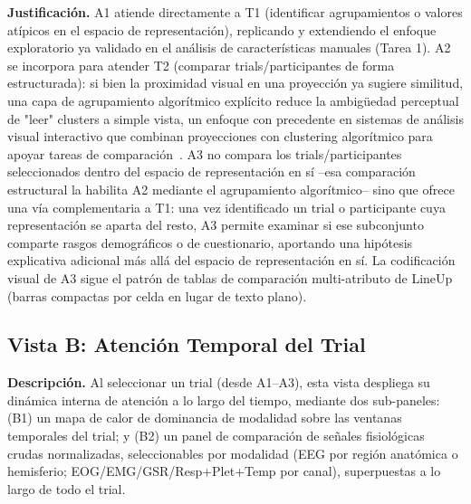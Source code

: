 \textbf{Justificación.} A1 atiende directamente a T1 (identificar agrupamientos o valores atípicos en el espacio de representación), replicando y extendiendo el enfoque exploratorio ya validado en el análisis de características manuales (Tarea 1). A2 se incorpora para atender T2 (comparar trials/participantes de forma estructurada): si bien la proximidad visual en una proyección ya sugiere similitud, una capa de agrupamiento algorítmico explícito reduce la ambigüedad perceptual de "leer" clusters a simple vista, un enfoque con precedente en sistemas de análisis visual interactivo que combinan proyecciones con clustering algorítmico para apoyar tareas de comparación~\cite{evoair}. A3 no compara los trials/participantes seleccionados dentro del espacio de
representación en sí --esa comparación estructural la habilita A2 mediante
el agrupamiento algorítmico-- sino que ofrece una vía complementaria a T1:
una vez identificado un trial o participante cuya representación se aparta
del resto, A3 permite examinar si ese subconjunto comparte rasgos
demográficos o de cuestionario, aportando una hipótesis explicativa
adicional más allá del espacio de representación en sí. La codificación
visual de A3 sigue el patrón de tablas de comparación multi-atributo de
LineUp~\cite{gratzl2013lineup} (barras compactas por celda en lugar de texto
plano).

\subsection{Vista B: Atención Temporal del Trial}
\label{sec:vista_b}

\textbf{Descripción.} Al seleccionar un trial (desde A1--A3), esta vista despliega su dinámica interna de atención a lo largo del tiempo, mediante dos sub-paneles: (B1) un mapa de calor de dominancia de modalidad sobre las ventanas temporales del trial; y (B2) un panel de comparación de señales fisiológicas crudas normalizadas, seleccionables por modalidad (EEG por región anatómica o hemisferio; EOG/EMG/GSR/Resp+Plet+Temp por canal), superpuestas a lo largo de todo el trial.

